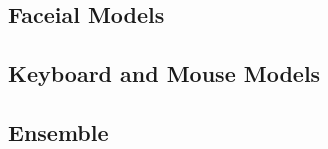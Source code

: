 
    \subsection{Faceial Models}
    \subsection{Keyboard and Mouse Models}
    \subsection{Ensemble}
